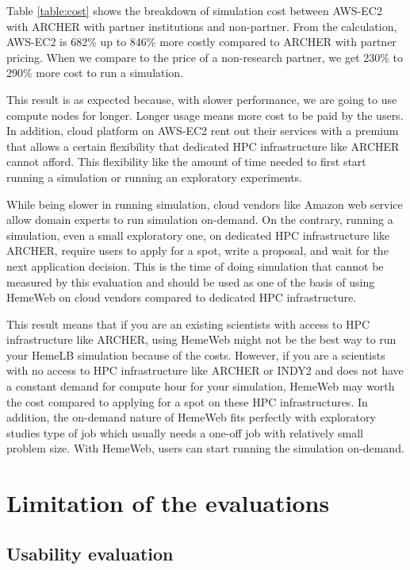 Table \ref{table:cost} shows the breakdown of simulation cost between AWS-EC2 with ARCHER with partner institutions and non-partner. From the calculation, AWS-EC2 is 682\% up to 846\% more costly compared to ARCHER with partner pricing. When we compare to the price of a non-research partner, we get 230\% to 290\% more cost to run a simulation. 


This result is as expected because, with slower performance, we are going to use compute nodes for longer. Longer usage means more cost to be paid by the users. In addition, cloud platform on AWS-EC2 rent out their services with a premium that allows a certain flexibility that dedicated HPC infrastructure like ARCHER cannot afford. This flexibility like the amount of time needed to first start running a simulation or running an exploratory experiments.

While being slower in running simulation, cloud vendors like Amazon web service allow domain experts to run simulation on-demand. On the contrary,  running a simulation,  even a small exploratory one, on dedicated HPC infrastructure like ARCHER, require users to apply for a spot, write a proposal, and wait for the next application decision. This is the time of doing simulation that cannot be measured by this evaluation and should be used as one of the basis of using HemeWeb on cloud vendors compared to dedicated HPC infrastructure.

This result means that if you are an existing scientists with access to HPC infrastructure like ARCHER, using HemeWeb might not be the best way to run your HemeLB simulation because of the costs. However, if you are a scientists with no access to HPC infrastructure like ARCHER or INDY2 and does not have a constant demand for compute hour for your simulation, HemeWeb may worth the cost compared to applying for a spot on these HPC infrastructures. In addition, the on-demand nature of HemeWeb fits perfectly with exploratory studies type of job which usually needs a one-off job with relatively small problem size. With HemeWeb, users can start running the simulation on-demand.





\section {Limitation of the evaluations}

\subsection{Usability evaluation}

